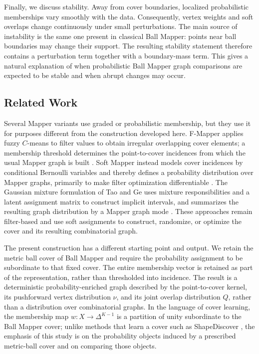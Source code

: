\documentclass[9pt,a4paper,twocolumn,twoside]{extarticle}
\theoremstyle{definition}
\begin{document}
Finally, we discuss stability. Away from cover boundaries, localized probabilistic memberships vary smoothly with the data. Consequently, vertex weights and soft overlaps change continuously under small perturbations. The main source of instability is the same one present in classical Ball Mapper: points near ball boundaries may change their support. The resulting stability statement therefore contains a perturbation term together with a boundary-mass term. This gives a natural explanation of when probabilistic Ball Mapper graph comparisons are expected to be stable and when abrupt changes may occur. 

\subsection{Related Work}

Several Mapper variants use graded or probabilistic membership, but they use it for purposes different from the construction developed here. F-Mapper applies fuzzy $C$-means to filter values to obtain irregular overlapping cover elements; a membership threshold determines the point-to-cover incidences from which the usual Mapper graph is built \cite{bui2020fmapper}. Soft Mapper instead models cover incidences by conditional Bernoulli variables and thereby defines a probability distribution over Mapper graphs, primarily to make filter optimization differentiable \cite{oulhaj2024differentiablemapper}. The Gaussian mixture formulation of Tao and Ge uses mixture responsibilities and a latent assignment matrix to construct implicit intervals, and summarizes the resulting graph distribution by a Mapper graph mode \cite{tao2025implicitmapper}. These approaches remain filter-based and use soft assignments to construct, randomize, or optimize the cover and its resulting combinatorial graph.

The present construction has a different starting point and output. We retain the metric ball cover of Ball Mapper and require the probability assignment to be subordinate to that fixed cover. The entire membership vector is retained as part of the representation, rather than thresholded into incidence. The result is a deterministic probability-enriched graph described by the point-to-cover kernel, its pushforward vertex distribution $\nu$, and its joint overlap distribution $Q$, rather than a distribution over combinatorial graphs. In the language of cover learning, the membership map $w\colon X\to\Delta^{K-1}$ is a partition of unity subordinate to the Ball Mapper cover; unlike methods that learn a cover such as ShapeDiscover \cite{scoccola2025coverlearning}, the emphasis of this study is on the probability objects induced by a prescribed metric-ball cover and on comparing those objects.
\end{document}
